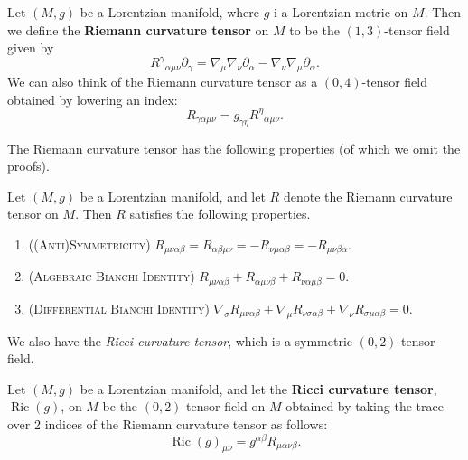\documentclass{article}
\begin{document}
\begin{definition}
	Let $(M, g)$ be a Lorentzian manifold, where $g$ i a Lorentzian metric on $M$. Then we define the \textbf{Riemann curvature tensor} on $M$ to be the $(1,3)$-tensor field given by 
	\begin{equation*}
		{R^{\gamma}}_{\alpha\mu\nu}\partial_{\gamma} = \nabla_{\mu}\nabla_{\nu}\partial_{\alpha}- \nabla_{\nu}\nabla_{\mu}\partial_{\alpha}. 
	\end{equation*}
	We can also think of the Riemann curvature tensor as a $(0,4)$-tensor field obtained by lowering an index:
	\begin{equation*}
		R_{\gamma\alpha\mu\nu} = g_{\gamma\eta}{R^{\eta}}_{\alpha\mu\nu}. 
	\end{equation*}
\end{definition} 
The Riemann curvature tensor has the following properties (of which we omit the proofs). 
\begin{prop}
	Let $(M, g)$ be a Lorentzian manifold, and let $R$ denote the Riemann curvature tensor on $M$. Then $R$ satisfies the following properties. \vspace{-0.25cm}
	\begin{enumerate}[itemsep =-2pt,label = (\roman{*})]
		\item (\textsc{(Anti)Symmetricity}) $R_{\mu\nu\alpha\beta} = R_{\alpha\beta\mu\nu} =-R_{\nu\mu\alpha\beta} = -R_{\mu\nu\beta\alpha}$. 
		\item (\textsc{Algebraic Bianchi Identity}) $R_{\mu\nu\alpha\beta} + R_{\alpha\mu\nu\beta} + R_{\nu\alpha\mu\beta} = 0$. 
		\item (\textsc{Differential Bianchi Identity}) $\nabla_{\sigma}R_{\mu\nu\alpha\beta} + \nabla_{\mu}R_{\nu\sigma\alpha\beta} + \nabla_{\nu}R_{\sigma\mu\alpha\beta} = 0$. 
	\end{enumerate}
\end{prop}
We also have the \textit{Ricci curvature tensor}, which is a symmetric $(0,2)$-tensor field. 
\begin{definition}
	Let $(M, g)$ be a Lorentzian manifold, and let the \textbf{Ricci curvature tensor}, $\operatorname{Ric}(g)$, on $M$ be the $(0,2)$-tensor field on $M$ obtained by taking the trace over 2 indices of the Riemann curvature tensor as follows:
	\begin{equation*}
		\operatorname{Ric}(g)_{\mu\nu} = g^{\alpha\beta}R_{\mu\alpha\nu \beta}. 
	\end{equation*}
\end{definition} 
\end{document}

